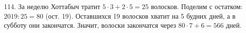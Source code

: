 114. За неделю Хоттабыч тратит $5\cdot3+2\cdot5=25$ волосков. Поделим с остатком: $2019:25=80$ (ост. 19). Оставшихся 19 волосков хватит на 5 будних дней, а в субботу они закончатся. Значит, волоски закончатся через $80\cdot7+6=566$ дней.\\
